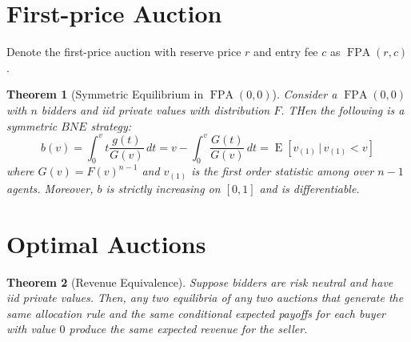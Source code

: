 \documentclass[letter, 10pt]{article}
\newtheorem{theorem}{Theorem}[section]
\theoremstyle{definition}
\DeclareMathOperator{\E}{E}
\DeclareMathOperator{\FPA}{FPA}
\begin{document}
\begin{spacing}{1.1}
\section{First-price Auction}

Denote the first-price auction with reserve price $r$ and
entry fee $c$ as $\FPA(r,c)$. 

\begin{theorem}[Symmetric Equilibrium in $\FPA(0,0)$]
  Consider a $\FPA(0,0)$ with $n$ bidders and iid
  private values with distribution $F$. THen the
  following is a symmetric $BNE$ strategy:
  \begin{equation}
    \label{eq:1}
    b(v) = \int_0^v t \frac{g(t)}{G(v)}\,dt = v -
    \int_0^v \frac{G(t)}{G(v)}\, dt = \E[v_{(1)}\,|\,v_{(1)}<v]
  \end{equation}
  where $G(v) = F(v)^{n-1}$ and $v_{(1)}$ is the first
  order statistic among over $n-1$ agents. Moreover, $b$
  is strictly increasing on $[0,1]$ and is
  differentiable.
\end{theorem}

\section{Optimal Auctions}

\begin{theorem}[Revenue Equivalence]
  Suppose bidders are risk neutral and have iid private
  values. Then, any two equilibria of any two auctions that generate
  the same allocation rule and the same conditional
  expected payoffs for each buyer with value $0$ produce
  the same expected revenue for the seller.
\end{theorem}


\end{spacing}
\end{document}
